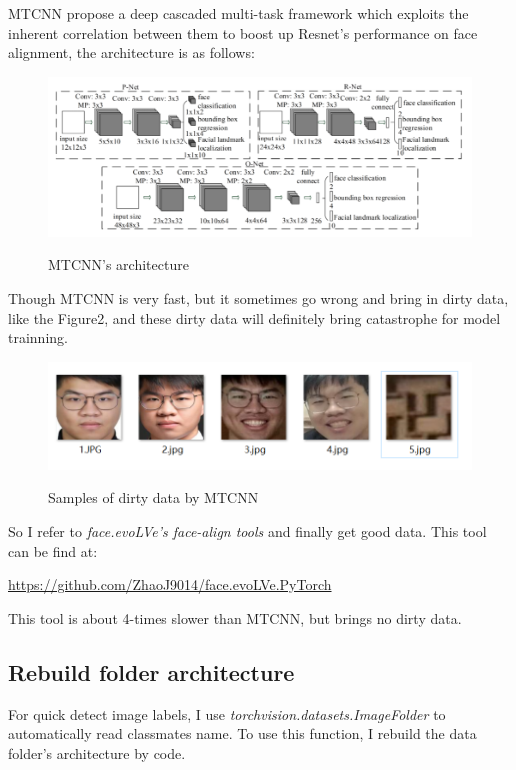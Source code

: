 \documentclass{article}
\begin{document}
MTCNN propose a deep cascaded multi-task framework which
exploits the inherent correlation between them to boost up Resnet's performance on face alignment, the architecture is as follows:
\begin{figure}[H]%
  \centering
  \caption{MTCNN's architecture}
  \includegraphics[width=\columnwidth]{IMG/MTCNN.png} %
  \label{Fig.RNN} %
\end{figure}
Though MTCNN is very fast, but it sometimes go wrong and bring in dirty data, like the Figure2, and these dirty data will definitely bring catastrophe for model trainning.
\begin{figure}[H]%
  \centering
  \caption{Samples of dirty data by MTCNN}
  \includegraphics[width=\columnwidth]{IMG/ML大作业筛选展示.png} %
  \label{Fig.RNN} %
\end{figure}
So I refer to \textit{face.evoLVe's face-align tools} and finally get good data.
This tool can be find at:
\begin{center}
  \url{https://github.com/ZhaoJ9014/face.evoLVe.PyTorch}
\end{center}
This tool is about 4-times slower than MTCNN, but brings no dirty data.
\subsection{Rebuild folder architecture}
For quick detect image labels, I use \textit{torchvision.datasets.ImageFolder} to automatically read classmates name. To use this function, I rebuild the data folder's architecture by code.
\end{document}
